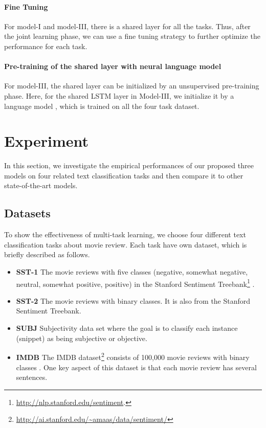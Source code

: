 \documentclass{article}
\begin{document}
\paragraph{Fine Tuning}
For model-I and model-III, there is a shared layer for all the tasks. Thus, after the joint learning phase, we can use a fine tuning strategy to further optimize the performance for each task.

\vspace{-1em}
\paragraph{Pre-training of the shared layer with neural language model}
For model-III, the shared layer can be initialized by an unsupervised pre-training phase. Here, for the shared LSTM layer in Model-III, we initialize it by a language model \cite{bengio2007greedy}, which is trained on all the four task dataset.



\section{Experiment}

In this section, we investigate the empirical performances of our proposed three models on four related text classification tasks and then compare it to other state-of-the-art models.

\subsection{Datasets}

To show the effectiveness of multi-task learning, we choose four different text classification tasks about movie review.
Each task have own dataset, which is briefly described as follows.

\begin{itemize}
  \item \textbf{SST-1} The movie reviews with five classes (negative, somewhat negative, neutral, somewhat positive, positive) in the Stanford Sentiment Treebank\footnote{\url{http://nlp.stanford.edu/sentiment}.} \cite{socher2013recursive}.
  \item \textbf{SST-2} The movie reviews with binary classes. It is also from the Stanford Sentiment Treebank.
  \item \textbf{SUBJ} Subjectivity data set where the goal is to classify each instance (snippet) as being subjective or objective. \cite{pang2004sentimental}
  \item \textbf{IMDB} The IMDB dataset\footnote{\url{http://ai.stanford.edu/~amaas/data/sentiment/}} consists of 100,000 movie reviews with binary classes  \cite{maas2011learning}. One key aspect of this dataset is that each movie review has several sentences. \end{itemize}
\end{document}
